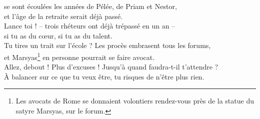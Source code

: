 \documentclass[12pt]{book} %
\begin{document}
\begin{alignment}
\begin{translation}
\begin{ekdverse}[type={distiques_élégiaques}]
\begin{patverse*}
        se sont écoulées les années de Pélée, de Priam et Nestor, \\ 
        et l'âge de la retraite serait déjà passé. \\ 
        Lance toi ! – trois rhéteurs ont déjà trépassé en un an – \\ 
        si tu as du c\oe ur, si tu as du talent. \\ 
        Tu tires un trait sur l'école ? Les procès embrasent tous les forums, \\ 
        et Marsyas\footnote{Les avocats de Rome se donnaient volontiers rendez-vous près de la statue du satyre Marsyas, sur le forum.} en personne pourrait se faire avocat. \\ 
        Allez, debout ! Plus d'excuses ! Jusqu'à quand faudra-t-il t'attendre ? \\ 
        À balancer sur ce que tu veux être, tu risques de n'être plus rien. \\
        \end{patverse*} 
    \end{ekdverse}
  \end{translation}
\end{alignment}
\end{document}
